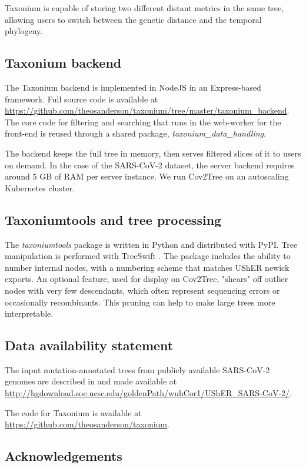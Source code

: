 Taxonium is capable of storing two different distant metrics in the same tree, allowing users to switch between the genetic distance and the temporal phylogeny. 


\subsection*{Taxonium backend}
The Taxonium backend is implemented in NodeJS in an Express-based framework. Full source code is available at \url{https://github.com/theosanderson/taxonium/tree/master/taxonium_backend}. The core code for filtering and searching that runs in the web-worker for the front-end is reused through a shared package, \emph{taxonium\_data\_handling}.

The backend keeps the full tree in memory, then serves filtered slices of it to users on demand. In the case of the SARS-CoV-2 dataset, the server backend requires around 5 GB of RAM per server instance. We run Cov2Tree on an autoscaling Kubernetes cluster.

\subsection*{Taxoniumtools and tree processing}
The \emph{taxoniumtools} package is written in Python and distributed with PyPI. Tree manipulation is performed with TreeSwift \citep{moshiri2020treeswift}. The package includes the ability to number internal nodes, with a numbering scheme that matches UShER newick exports. An optional feature, used for display on Cov2Tree, "shears" off outlier nodes with very few descendants, which often represent sequencing errors or occasionally recombinants. This pruning can help to make large trees more interpretable.


\small

\subsection*{Data availability statement}

The input mutation-annotated trees from publicly available SARS-CoV-2 genomes are described in \cite{McBroome2021} and made available at \url{http://hgdownload.soe.ucsc.edu/goldenPath/wuhCor1/UShER_SARS-CoV-2/}.

The code for Taxonium is available at \url{https://github.com/theosanderson/taxonium}.


\subsection*{Acknowledgements}

